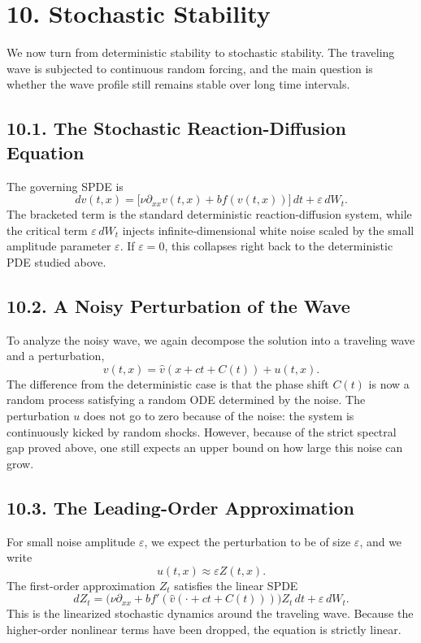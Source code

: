 \documentclass[11pt]{article}
\theoremstyle{definition}
\theoremstyle{remark}
\begin{document}
\section*{10. Stochastic Stability}
We now turn from deterministic stability to stochastic stability. The traveling wave is subjected to continuous random forcing, and the main question is whether the wave profile still remains stable over long time intervals.

\subsection*{10.1. The Stochastic Reaction-Diffusion Equation}
The governing SPDE is
\[
dv(t,x)=\bigl[\nu\partial_{xx}v(t,x)+bf(v(t,x))\bigr]\,dt+\varepsilon\,dW_t.
\]
The bracketed term is the standard deterministic reaction-diffusion system, while the critical term $\varepsilon\,dW_t$ injects infinite-dimensional white noise scaled by the small amplitude parameter $\varepsilon$. If $\varepsilon=0$, this collapses right back to the deterministic PDE studied above.

\subsection*{10.2. A Noisy Perturbation of the Wave}
To analyze the noisy wave, we again decompose the solution into a traveling wave and a perturbation,
\[
v(t,x)=\hat v(x+ct+C(t))+u(t,x).
\]
The difference from the deterministic case is that the phase shift $C(t)$ is now a random process satisfying a random ODE determined by the noise. The perturbation $u$ does not go to zero because of the noise: the system is continuously kicked by random shocks. However, because of the strict spectral gap proved above, one still expects an upper bound on how large this noise can grow.

\subsection*{10.3. The Leading-Order Approximation}
For small noise amplitude $\varepsilon$, we expect the perturbation to be of size $\varepsilon$, and we write
\[
u(t,x)\approx \varepsilon Z(t,x).
\]
The first-order approximation $Z_t$ satisfies the linear SPDE
\[
dZ_t=\bigl(\nu\partial_{xx}+bf'(\hat v(\cdot+ct+C(t)))\bigr)Z_t\,dt+\varepsilon\,dW_t.
\]
This is the linearized stochastic dynamics around the traveling wave. Because the higher-order nonlinear terms have been dropped, the equation is strictly linear.
\end{document}
